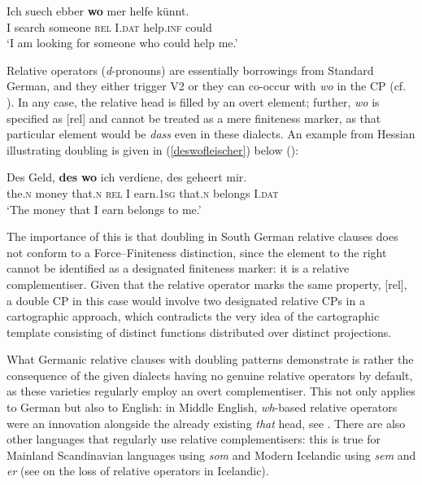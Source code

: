 \ea \gll Ich suech ebber \textbf{wo} mer helfe künnt. \label{relwo}\\
I search someone \textsc{rel} I.\textsc{dat} help.\textsc{inf} could\\
\glt `I am looking for someone who could help me.'
\z

Relative operators (\textit{d}-pronouns) are essentially borrowings from Standard German, and they either trigger V2 or they can co-occur with \textit{wo} in the CP (cf. \citealt{weise1917}). In any case, the relative head is filled by an overt element; further, \textit{wo} is specified as [rel] and cannot be treated as a mere finiteness marker, as that particular element would be \textit{dass} even in these dialects. An example from Hessian illustrating doubling is given in (\ref{deswofleischer}) below (\citealt[ex. 3d]{fleischer2016}):

\ea \gll Des Geld, \textbf{des} \textbf{wo} ich verdiene, des geheert mir. \label{deswofleischer}\\
the.\textsc{n} money that.\textsc{n} \textsc{rel} I earn.\textsc{1sg} that.\textsc{n} belongs I.\textsc{dat}\\
\glt `The money that I earn belongs to me.'
\z 

The importance of this is that doubling in South German relative clauses does not conform to a Force--Finiteness distinction, since the element to the right cannot be identified as a designated finiteness marker: it is a relative complementiser. Given that the relative operator marks the same property, [rel], a double CP in this case would involve two designated relative CPs in a cartographic approach, which contradicts the very idea of the cartographic template consisting of distinct functions distributed over distinct projections.

What Germanic relative clauses with doubling patterns demonstrate is rather the consequence of the given dialects having no genuine relative operators by default, as these varieties regularly employ an overt complementiser. This not only applies to German but also to English: in Middle English, \textit{wh}-based relative operators were an innovation alongside the already existing \textit{that} head, see \cite{vangelderen2004, vangelderen2009}. There are also other languages that regularly use relative complementisers: this is true for Mainland Scandinavian languages using \textit{som} and Modern Icelandic using \textit{sem} and \textit{er} (see \citealt{thrainsson2007} on the loss of relative operators in Icelandic).

